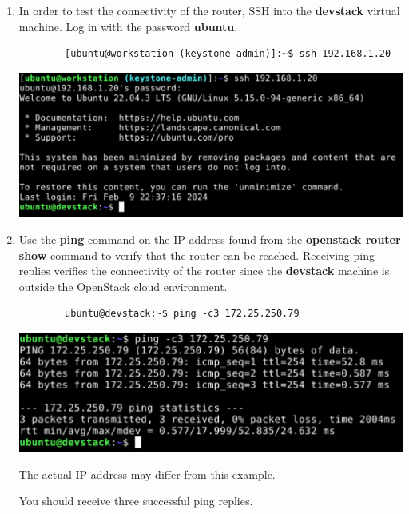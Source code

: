 \documentclass[letterpaper, 12pt]{article}
\begin{document}
\begin{enumerate}
    \item In order to test the connectivity of the router, SSH into the \textbf{devstack} virtual machine.
    Log in with the password \textbf{ubuntu}.
    \begin{lstlisting}
        [ubuntu@workstation (keystone-admin)]:~$ ssh 192.168.1.20
    \end{lstlisting}

    \begin{center}
        \includegraphics[width=\linewidth]{images/part2/step16.png}
    \end{center}

    \item Use the \textbf{ping} command on the IP address found from the \textbf{openstack router show} command to verify that the router can be reached.
    Receiving ping replies verifies the connectivity of the router since the \textbf{devstack} machine is outside the OpenStack cloud environment.
    \begin{lstlisting}
        ubuntu@devstack:~$ ping -c3 172.25.250.79
    \end{lstlisting}

    \begin{center}
        \includegraphics[width=\linewidth]{images/part2/step17.png}
    \end{center}

    \begin{notebox}
        The actual IP address may differ from this example.
    \end{notebox}
    \begin{notebox}
        You should receive three successful ping replies.
    \end{notebox}


\end{enumerate}
\end{document}
